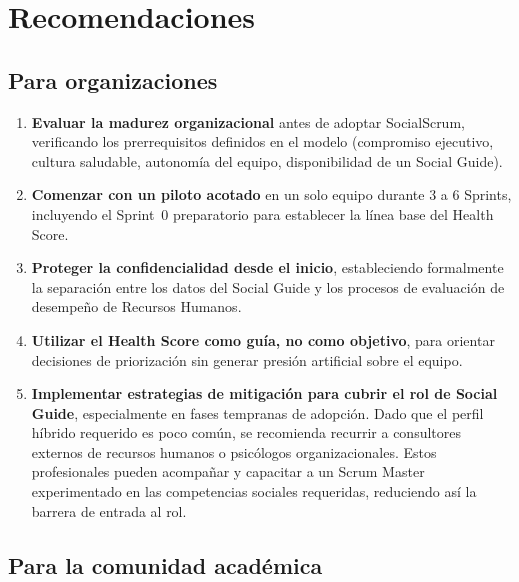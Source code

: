 \section{Recomendaciones}
\label{sec:recomendaciones}

\subsection{Para organizaciones}

\begin{enumerate}
    \item \textbf{Evaluar la madurez organizacional} antes de adoptar SocialScrum, verificando los prerrequisitos definidos en el modelo (compromiso ejecutivo, cultura saludable, autonomía del equipo, disponibilidad de un Social Guide).

    \item \textbf{Comenzar con un piloto acotado} en un solo equipo durante 3 a 6 Sprints, incluyendo el Sprint~0 preparatorio para establecer la línea base del Health Score.

    \item \textbf{Proteger la confidencialidad desde el inicio}, estableciendo formalmente la separación entre los datos del Social Guide y los procesos de evaluación de desempeño de Recursos Humanos.

    \item \textbf{Utilizar el Health Score como guía, no como objetivo}, para orientar decisiones de priorización sin generar presión artificial sobre el equipo.

    \item \textbf{Implementar estrategias de mitigación para cubrir el rol de Social Guide}, especialmente en fases tempranas de adopción. Dado que el perfil híbrido requerido es poco común, se recomienda recurrir a consultores externos de recursos humanos o psicólogos organizacionales. Estos profesionales pueden acompañar y capacitar a un Scrum Master experimentado en las competencias sociales requeridas, reduciendo así la barrera de entrada al rol.
\end{enumerate}

\subsection{Para la comunidad académica}

